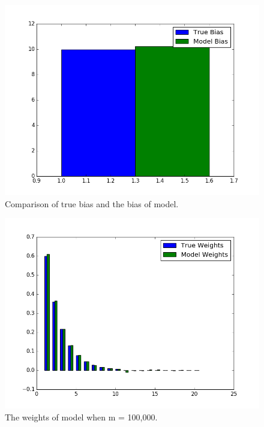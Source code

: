 \documentclass[letter, 12pt]{article}
\begin{document}
\begin{enumerate}
\begin{figure}[H]
\begin{minipage}{.48\textwidth}
		    	\includegraphics[width=\linewidth]{q1-2.png}
		    	\caption{Comparison of true bias and the bias of model.}
		    	\label{fig:q1-2}
		    \end{minipage}
    	\end{figure}
	    \begin{figure}[H]
		    \centering
		    \centering
		    \includegraphics[width=0.7\linewidth]{q1-3.png}
		    \caption{The weights of model when m = 100,000.}
		    \label{fig:q1-3}
		\end{figure}
    	

\end{enumerate}
\end{document}
